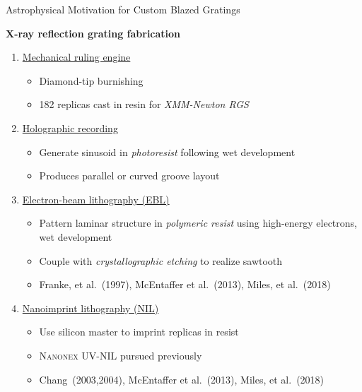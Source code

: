 \documentclass[aspectratio=169,9pt]{beamer}
\begin{document}
\begin{frame}{Astrophysical Motivation for Custom Blazed Gratings}
\begin{minipage}[t]{0.55\linewidth}
 \textbf{X-ray reflection grating fabrication}
 \begin{enumerate}
  \item \underline{Mechanical ruling engine}
  \begin{itemize}
    \item Diamond-tip burnishing%
    \item 182 replicas cast in resin for \emph{XMM-Newton RGS}
  \end{itemize}
  \item \underline{Holographic recording} %
  \begin{itemize}
    \item Generate sinusoid in \emph{photoresist} following wet development
    \item Produces parallel or curved groove layout
  \end{itemize}
  \item \underline{Electron-beam lithography (EBL)}
  \begin{itemize}
    \item Pattern laminar structure in \emph{polymeric resist} using high-energy electrons, wet development %
    \item Couple with \emph{crystallographic etching} to realize sawtooth %
    \item[$\square$] {\footnotesize Franke, et al.~(1997), McEntaffer et al.~(2013), Miles, et al.~(2018)}
  \end{itemize}
  \item \underline{Nanoimprint lithography (NIL)}
  \begin{itemize}
    \item Use silicon master to imprint replicas in resist %
    \item \textsc{Nanonex} UV-NIL pursued previously %
    \item[$\square$] {\footnotesize Chang~(2003,2004), McEntaffer et al.~(2013), Miles, et al.~(2018)}

\end{itemize}
\end{enumerate}
\end{minipage}
\end{frame}
\end{document}
